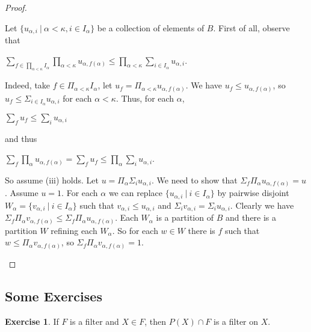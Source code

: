 \documentclass[8pt]{article}
\theoremstyle{definition}
\theoremstyle{definition}
\theoremstyle{definition}
\theoremstyle{definition}
\theoremstyle{definition}
\theoremstyle{definition}
\theoremstyle{definition}
\theoremstyle{definition}
\theoremstyle{definition}
\theoremstyle{definition}
\theoremstyle{definition}
\theoremstyle{definition}
\theoremstyle{definition}
\newtheorem{exercise}{Exercise}[section]
\theoremstyle{definition}
\theoremstyle{question}
\begin{document}
\begin{proof}
\begin{enumerate}
    Let $\{ u_{\alpha, i} \: | \: \alpha < \kappa, i \in I_{\alpha} \}$ be a collection of elements
    of $B$. First of all, observe that
    \begin{center}
      $\sum \limits_{f \in \prod \limits_{\alpha < \kappa} I_{\alpha}} \prod \limits_{\alpha < \kappa} u_{\alpha, f(\alpha)} \leq \prod \limits_{\alpha < \kappa} \sum \limits_{i \in I_{\alpha}} u_{\alpha, i}$.
    \end{center}
    Indeed, take $f \in \Pi_{\alpha < \kappa} I_{\alpha}$, let $u_f = \Pi_{\alpha < \kappa} u_{\alpha, f(\alpha)}$.
    We have $u_f \leq u_{\alpha, f(\alpha)}$, so $u_f \leq \Sigma_{i \in I_{\alpha}} u_{\alpha, i}$ 
    for each $\alpha < \kappa$. Thus, for each $\alpha$,
    \begin{center}
      $\sum \limits_{f} u_f \leq \sum \limits_{i} u_{\alpha, i}$
    \end{center}
    and thus
    \begin{center}
      $\sum \limits_{f} \prod \limits_{\alpha} u_{\alpha, f(\alpha)} = \sum \limits_{f} u_f \leq \prod \limits_{\alpha} \sum \limits_{i} u_{\alpha, i}$.
    \end{center}
    So assume (iii) holds. Let $u = \Pi_{\alpha} \Sigma_{i} u_{\alpha, i}$. We need to show that
    $\Sigma_f \Pi_{\alpha} u_{\alpha, f(\alpha)} = u$. Assume $u = 1$. For each $\alpha$ we can replace 
    $\{ u_{\alpha, i} \: | \: i \in I_{\alpha}\}$ by pairwise disjoint 
    $W_{\alpha} = \{ v_{\alpha, i} \: | \: i \in I_{\alpha}\}$ such that $v_{\alpha, i} \leq u_{\alpha, i}$ and
    $\Sigma_i v_{\alpha, i} = \Sigma_i u_{\alpha, i}$.
    Clearly we have $\Sigma_f \Pi_{\alpha} v_{\alpha, f(\alpha)} \leq \Sigma_f \Pi_{\alpha} u_{\alpha, f(\alpha)}$.
    Each $W_{\alpha}$ is a partition of $B$ and there is a partition $W$ refining each $W_{\alpha}$.
    So for each $w \in W$ there is $f$ such that $w \leq \Pi_{\alpha} v_{\alpha, f(\alpha)}$, so $\Sigma_f \Pi_{\alpha} v_{\alpha, f(\alpha)} = 1$.
  \end{enumerate}
\end{proof}

\subsection{Some Exercises}

\begin{exercise}
  If $F$ is a filter and $X \in F$, then $P(X) \cap F$ is a filter on $X$.
\end{exercise}
\end{document}
